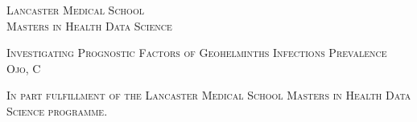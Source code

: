 
\begin{titlepage}

        \begin{center}

            \vspace*{1cm}

            \begin{minipage}{0.95\textwidth}

                \begin{center}
                    {\sffamily \small \textsc{Lancaster Medical School\\Masters in Health Data Science}}
                    \vspace{3.5cm}

                    {\sffamily \large \textsc{Investigating Prognostic Factors of Geohelminths Infections Prevalence\\
                        Ojo, C}}
                    \vspace{9.5cm}

                    {\sffamily \small \textsc{In part fulfillment of the Lancaster Medical School Masters in Health Data Science programme.}}

                \end{center}

            \end{minipage}

        \end{center}

\end{titlepage}